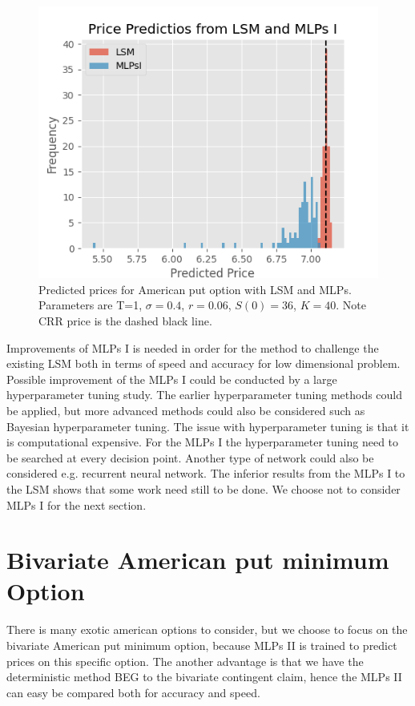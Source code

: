 \begin{figure}[th]
\centering
\includegraphics{Figures/histLSMMLPsI.png}
\decoRule
\caption[Histogram Price Predictions]{Predicted prices for American put option with LSM and MLPs. Parameters are T=1, $\sigma=0.4$, $r=0.06$, $S(0)=36$, $K=40$. Note CRR price is the dashed black line.}
\label{fig:histLSMMLPsI}
\end{figure}

Improvements of MLPs I is needed in order for the method to challenge the existing LSM both in terms of speed and accuracy for low dimensional problem. Possible improvement of the MLPs I could be conducted by a large hyperparameter tuning study. The earlier hyperparameter tuning methods could be applied, but more advanced methods could also be considered such as Bayesian hyperparameter tuning. The issue with hyperparameter tuning is that it is computational expensive. For the MLPs I the hyperparameter tuning need to be searched at every decision point. Another type of network could also be considered e.g. recurrent neural network. The inferior results from the MLPs I to the LSM shows that some work need still to be done. We choose not to consider MLPs I for the next section.\\
\section{Bivariate American put minimum Option}
There is many exotic american options to consider, but we choose to focus on the bivariate American put minimum option, because MLPs II is trained to predict prices on this specific option. The another advantage is that we have the deterministic method BEG to the bivariate contingent claim, hence the MLPs II can easy be compared both for accuracy and speed.\\

